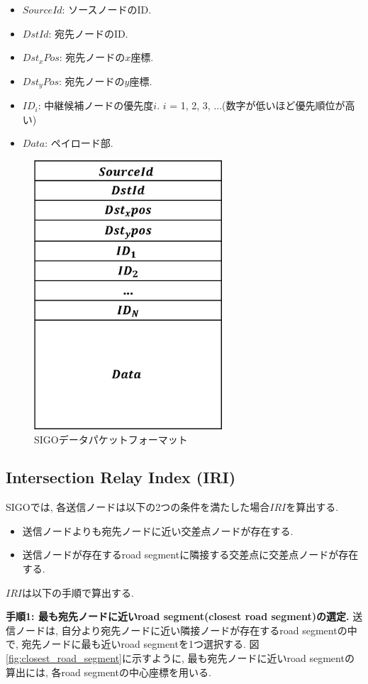 \documentclass[10pt]{jreport}
\begin{document}
\begin{itemize}
	\item $SourceId$: ソースノードのID.
	\item $DstId$: 宛先ノードのID.
	\item $Dst_x Pos$: 宛先ノードの$x$座標.
	\item $Dst_y Pos$: 宛先ノードの$y$座標.
	\item $ID_i$: 中継候補ノードの優先度$i$. $i$ = 1, 2, 3, ...(数字が低いほど優先順位が高い) 
	\item $Data$: ペイロード部.
\end{itemize}


\begin{figure}[!ht]
	\centering
	\includegraphics[width=70mm]{figures/SIGO_packet_format.eps}
	\caption{SIGOデータパケットフォーマット}
	\label{fig:SIGO_packet}
\end{figure}


\subsection{Intersection Relay Index (IRI)}
SIGOでは, 各送信ノードは以下の2つの条件を満たした場合$IRI$を算出する.

\begin{itemize}
	\item 送信ノードよりも宛先ノードに近い交差点ノードが存在する.
	\item 送信ノードが存在するroad segmentに隣接する交差点に交差点ノードが存在する.
\end{itemize}

$IRI$は以下の手順で算出する. \par
\textbf{手順1: 最も宛先ノードに近いroad segment(closest road segment)の選定.}
送信ノードは, 自分より宛先ノードに近い隣接ノードが存在するroad segmentの中で, 宛先ノードに最も近いroad segmentを1つ選択する. 図\ref{fig:closest_road_segment}に示すように, 最も宛先ノードに近いroad segmentの算出には, 各road segmentの中心座標を用いる. 
\end{document}
